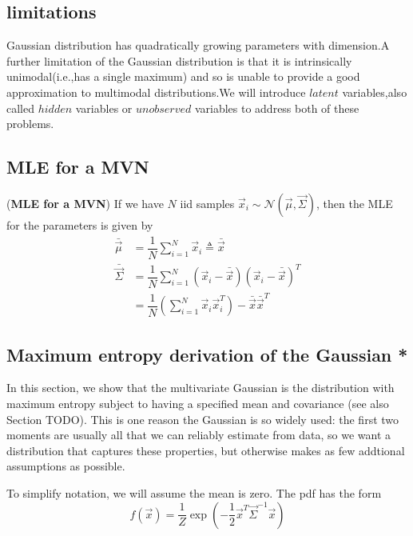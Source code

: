 \subsection{limitations}
Gaussian distribution has quadratically growing parameters with dimension.A further limitation of the Gaussian distribution is that it is intrinsically unimodal(i.e.,has a single maximum) and so is unable to provide a good approximation to multimodal distributions.We will introduce $latent$ variables,also called $hidden$ variables or $unobserved$ variables to address both of these problems.

\subsection{MLE for a MVN}
\begin{theorem}(\textbf{MLE for a MVN})
If we have $N$ iid samples $\vec{x}_i \sim \mathcal{N}(\vec{\mu},\vec{\Sigma})$, then the MLE for the parameters is given by
\begin{align}
\bar{\vec{\mu}}    & =\dfrac{1}{N}\sum\limits_{i=1}^N \vec{x}_i \triangleq \bar{\vec{x}} \\
\bar{\vec{\Sigma}} & =\dfrac{1}{N}\sum\limits_{i=1}^N (\vec{x}_i-\bar{\vec{x}})(\vec{x}_i-\bar{\vec{x}})^T \\
                     & =\dfrac{1}{N}\left(\sum\limits_{i=1}^N \vec{x}_i\vec{x}_i^T\right)-\bar{\vec{x}}\bar{\vec{x}}^T
\end{align}
\end{theorem}


\subsection{Maximum entropy derivation of the Gaussian *}
In this section, we show that the multivariate Gaussian is the distribution with maximum entropy subject to having a specified mean and covariance (see also Section TODO). This is one reason the Gaussian is so widely used: the first two moments are usually all that we can reliably estimate from data, so we want a distribution that captures these properties, but otherwise makes as few addtional assumptions as possible.

To simplify notation, we will assume the mean is zero. The pdf has the form
\begin{equation}
f(\vec{x})=\dfrac{1}{Z}\exp\left(-\dfrac{1}{2}\vec{x}^T\vec{\Sigma}^{-1}\vec{x}\right)
\end{equation}


